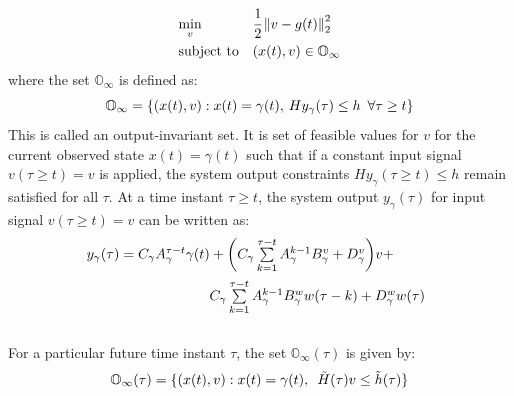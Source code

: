 \documentclass[letterpaper, 10 pt, conference]{ieeeconf}  %
\newcommand{\norm}[1]{\left\lVert#1\right\rVert}
\begin{document}
\begin{enumerate}
	\begin{equation}
	\begin{aligned}
	& \underset{v}{\text{min}}
	& & \cfrac{1}{2}\norm{v-g(t)}_2^2 \\
	& \text{subject to}
	& & 
	(x(t),v) \in \mathbb{O}_{\infty}
	\end{aligned}
	\label{RGprob}
	\end{equation}
	where the set $\mathbb{O}_{\infty}$ is defined as:
	\begin{equation*}
	\mathbb{O}_{\infty} = \{(x(t),v): x(t) = \gamma(t), \hspace{2pt} Hy_{\gamma}(\tau) \leq h \hspace{5pt} \forall \tau \geq t \} \\ 
	\end{equation*}
	This is called an output-invariant set.
	It is set of feasible values for $v$ for the current observed state $x(t)=\gamma(t)$ such that if a constant input signal $v(\tau \geq t)=v$ is applied, the system output constraints $Hy_{\gamma}(\tau \geq t) \leq h$ remain satisfied for all $\tau$.
	At a time instant $\tau \geq t$, the system output $y_{\gamma}(\tau)$ for input signal $v(\tau \geq t)=v$ can be written as:
	\begin{equation*}
	\hspace{-30pt}
	\begin{aligned}
	\begin{matrix}
	y_{\gamma}(\tau) = C_{\gamma}A_{\gamma}^{\tau - t}\gamma(t) + \bigg( C_{\gamma}\sum\limits_{k=1}^{\tau - t}A_{\gamma}^{k-1}B^v_{\gamma} + D_{\gamma}^v \bigg)v + \vspace{5pt}\\  \hspace{110pt} C_{\gamma}\sum\limits_{k=1}^{\tau - t}A_{\gamma}^{k-1}B^w_{\gamma}w(\tau-k) + D_{\gamma}^w w(\tau)
	\end{matrix}
	\end{aligned}
	\end{equation*} \vspace{24pt}\\
	For a particular future time instant $\tau$, the set $\mathbb{O}_{\infty}(\tau)$ is given by:
	\begin{equation*}
	\begin{matrix}
	\mathbb{O}_{\infty}(\tau) = \{(x(t),v): x(t) = \gamma(t), \hspace{5pt} \tilde{H}(\tau)v \leq \tilde{h}(\tau)\} \vspace{5pt}\\

\end{matrix}
\end{equation*}
\end{enumerate}
\end{document}
